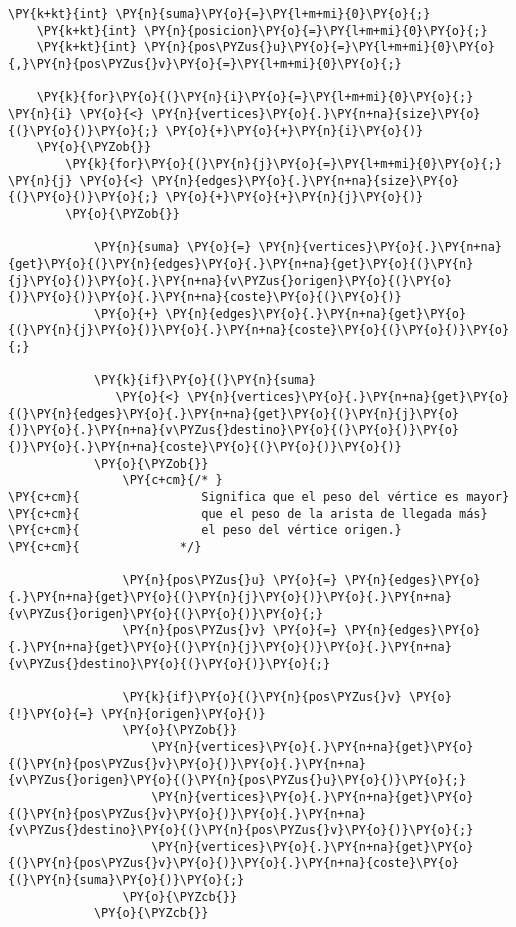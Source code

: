 \begin{Verbatim}[commandchars=\\\{\}]
    \PY{k+kt}{int} \PY{n}{suma}\PY{o}{=}\PY{l+m+mi}{0}\PY{o}{;}
    \PY{k+kt}{int} \PY{n}{posicion}\PY{o}{=}\PY{l+m+mi}{0}\PY{o}{;}
    \PY{k+kt}{int} \PY{n}{pos\PYZus{}u}\PY{o}{=}\PY{l+m+mi}{0}\PY{o}{,}\PY{n}{pos\PYZus{}v}\PY{o}{=}\PY{l+m+mi}{0}\PY{o}{;}

    \PY{k}{for}\PY{o}{(}\PY{n}{i}\PY{o}{=}\PY{l+m+mi}{0}\PY{o}{;} \PY{n}{i} \PY{o}{<} \PY{n}{vertices}\PY{o}{.}\PY{n+na}{size}\PY{o}{(}\PY{o}{)}\PY{o}{;} \PY{o}{+}\PY{o}{+}\PY{n}{i}\PY{o}{)}
	\PY{o}{\PYZob{}}
	    \PY{k}{for}\PY{o}{(}\PY{n}{j}\PY{o}{=}\PY{l+m+mi}{0}\PY{o}{;} \PY{n}{j} \PY{o}{<} \PY{n}{edges}\PY{o}{.}\PY{n+na}{size}\PY{o}{(}\PY{o}{)}\PY{o}{;} \PY{o}{+}\PY{o}{+}\PY{n}{j}\PY{o}{)}
		\PY{o}{\PYZob{}}
			
		    \PY{n}{suma} \PY{o}{=} \PY{n}{vertices}\PY{o}{.}\PY{n+na}{get}\PY{o}{(}\PY{n}{edges}\PY{o}{.}\PY{n+na}{get}\PY{o}{(}\PY{n}{j}\PY{o}{)}\PY{o}{.}\PY{n+na}{v\PYZus{}origen}\PY{o}{(}\PY{o}{)}\PY{o}{)}\PY{o}{.}\PY{n+na}{coste}\PY{o}{(}\PY{o}{)} 
			\PY{o}{+} \PY{n}{edges}\PY{o}{.}\PY{n+na}{get}\PY{o}{(}\PY{n}{j}\PY{o}{)}\PY{o}{.}\PY{n+na}{coste}\PY{o}{(}\PY{o}{)}\PY{o}{;}
		    
		    \PY{k}{if}\PY{o}{(}\PY{n}{suma} 
		       \PY{o}{<} \PY{n}{vertices}\PY{o}{.}\PY{n+na}{get}\PY{o}{(}\PY{n}{edges}\PY{o}{.}\PY{n+na}{get}\PY{o}{(}\PY{n}{j}\PY{o}{)}\PY{o}{.}\PY{n+na}{v\PYZus{}destino}\PY{o}{(}\PY{o}{)}\PY{o}{)}\PY{o}{.}\PY{n+na}{coste}\PY{o}{(}\PY{o}{)}\PY{o}{)}
			\PY{o}{\PYZob{}}
			    \PY{c+cm}{/* }
\PY{c+cm}{			       Significa que el peso del vértice es mayor}
\PY{c+cm}{			       que el peso de la arista de llegada más}
\PY{c+cm}{			       el peso del vértice origen.}
\PY{c+cm}{			    */}

			    \PY{n}{pos\PYZus{}u} \PY{o}{=} \PY{n}{edges}\PY{o}{.}\PY{n+na}{get}\PY{o}{(}\PY{n}{j}\PY{o}{)}\PY{o}{.}\PY{n+na}{v\PYZus{}origen}\PY{o}{(}\PY{o}{)}\PY{o}{;}
			    \PY{n}{pos\PYZus{}v} \PY{o}{=} \PY{n}{edges}\PY{o}{.}\PY{n+na}{get}\PY{o}{(}\PY{n}{j}\PY{o}{)}\PY{o}{.}\PY{n+na}{v\PYZus{}destino}\PY{o}{(}\PY{o}{)}\PY{o}{;}
				
			    \PY{k}{if}\PY{o}{(}\PY{n}{pos\PYZus{}v} \PY{o}{!}\PY{o}{=} \PY{n}{origen}\PY{o}{)}
				\PY{o}{\PYZob{}}
				    \PY{n}{vertices}\PY{o}{.}\PY{n+na}{get}\PY{o}{(}\PY{n}{pos\PYZus{}v}\PY{o}{)}\PY{o}{.}\PY{n+na}{v\PYZus{}origen}\PY{o}{(}\PY{n}{pos\PYZus{}u}\PY{o}{)}\PY{o}{;}
				    \PY{n}{vertices}\PY{o}{.}\PY{n+na}{get}\PY{o}{(}\PY{n}{pos\PYZus{}v}\PY{o}{)}\PY{o}{.}\PY{n+na}{v\PYZus{}destino}\PY{o}{(}\PY{n}{pos\PYZus{}v}\PY{o}{)}\PY{o}{;}
				    \PY{n}{vertices}\PY{o}{.}\PY{n+na}{get}\PY{o}{(}\PY{n}{pos\PYZus{}v}\PY{o}{)}\PY{o}{.}\PY{n+na}{coste}\PY{o}{(}\PY{n}{suma}\PY{o}{)}\PY{o}{;}
				\PY{o}{\PYZcb{}}
			\PY{o}{\PYZcb{}}
			    

\end{Verbatim}
